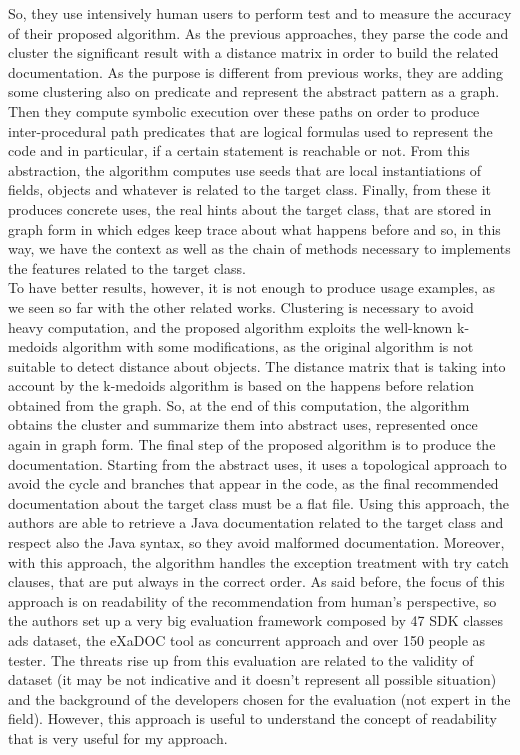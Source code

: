 So, they use intensively human users to perform test and to measure the accuracy of their proposed algorithm. As the previous approaches, they parse the code and cluster the significant result with a distance matrix in order to build the related documentation. As the purpose is different from previous works, they are adding some clustering also on predicate and represent the abstract pattern as a graph. Then they compute symbolic execution over these paths on order to produce inter-procedural path predicates that are logical formulas used to represent the code and in particular, if a certain statement is reachable or not. From this abstraction, the algorithm computes use seeds that are local instantiations of fields, objects and whatever is related to the target class. Finally, from these it produces concrete uses, the real hints about the target class, that are stored in graph form in which edges keep trace about what happens before and so, in this way, we have the context as well as the chain of methods necessary to implements the features related to the target class. \\
To have better results, however, it is not enough to produce usage examples, as we seen so far with the other related works. Clustering is necessary to avoid heavy computation, and the proposed algorithm exploits the well-known k-medoids algorithm with some modifications, as the original algorithm is not suitable to detect distance about objects. The distance matrix that is taking into account by the k-medoids algorithm is based on the happens before relation obtained from the graph. So, at the end of this computation, the algorithm obtains the cluster and summarize them into abstract uses, represented once again in graph form. The final step of the proposed algorithm is to produce the documentation. Starting from the abstract uses, it uses a topological approach to avoid the cycle and branches that appear in the code, as the final recommended documentation about the target class must be a flat file. Using this approach, the authors are able to retrieve a Java documentation related to the target class and respect also the Java syntax, so they avoid malformed documentation. Moreover, with this approach, the algorithm handles the exception treatment with try catch clauses, that are put always in the correct order. As said before, the focus of this approach is on readability of the recommendation from human's perspective, so the authors set up a very big evaluation framework composed by 47 SDK classes ads dataset, the eXaDOC tool as concurrent approach and over 150 people as tester. The threats rise up from this evaluation are related to the validity of dataset (it may be not indicative and it doesn't represent all possible situation) and the background of the developers chosen for the evaluation (not expert in the field). However, this approach is useful to understand the concept of readability that is very useful for my approach.

